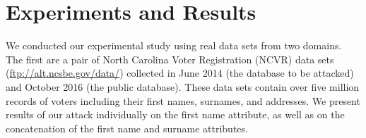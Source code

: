 \documentclass{llncs}
\begin{document}


\section{Experiments and Results}
\label{sec-data}

We conducted our experimental study using real data sets from two
domains.
%
The first are a pair of North Carolina Voter Registration (NCVR) data
sets (\url{ftp://alt.ncsbe.gov/data/})
collected in June 2014 (the database to be attacked) and October 2016
(the public database).
These data sets contain over five million records of voters including
their first names, surnames, and addresses. We present results of our
attack individually on the first name
attribute, as well as on the concatenation of the first name and
surname attributes.
\end{document}
